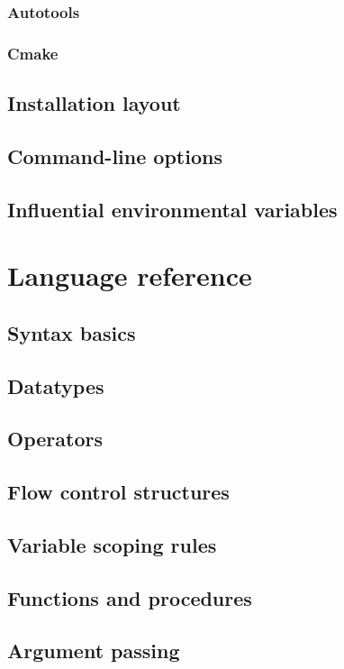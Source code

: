 \documentclass[10pt,titleauthor,openany]{mwbk}
\begin{document}
  \subsection{Autotools}
  
  \subsection{Cmake}
  
  \section{Installation layout}
  \section{Command-line options}
  \section{Influential environmental variables}

  \chapter{Language reference}
  \section{Syntax basics}
  
  \section{Datatypes}
  
  \section{Operators}
  \section{Flow control structures}
  
  \section{Variable scoping rules}
  
  \section{Functions and procedures}
  \section{Argument passing}
  
\end{document}
